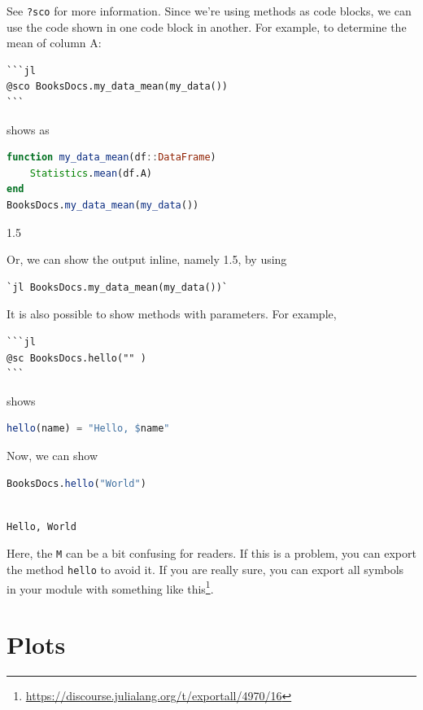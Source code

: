 \documentclass[
  notoc %
]{tufte-book}
\DeclareRobustCommand{\href}[2]{#2\footnote{\url{#1}}}
\newcommand{\passthrough}[1]{#1}
\begin{document}
See \passthrough{\lstinline!?sco!} for more information. Since we're
using methods as code blocks, we can use the code shown in one code
block in another. For example, to determine the mean of column A:

\begin{lstlisting}
```jl
@sco BooksDocs.my_data_mean(my_data())
```
\end{lstlisting}

shows as

\begin{lstlisting}[language=Julia]
function my_data_mean(df::DataFrame)
    Statistics.mean(df.A)
end
BooksDocs.my_data_mean(my_data())
\end{lstlisting}

1.5

Or, we can show the output inline, namely 1.5, by using

\begin{lstlisting}
`jl BooksDocs.my_data_mean(my_data())`
\end{lstlisting}

It is also possible to show methods with parameters. For example,

\begin{lstlisting}
```jl
@sc BooksDocs.hello("" )
```
\end{lstlisting}

shows

\begin{lstlisting}[language=Julia]
hello(name) = "Hello, $name"
\end{lstlisting}

Now, we can show

\begin{lstlisting}[language=Julia]
BooksDocs.hello("World")
\end{lstlisting}

\begin{lstlisting}[language=Output]

Hello, World

\end{lstlisting}

Here, the \passthrough{\lstinline!M!} can be a bit confusing for
readers. If this is a problem, you can export the method
\passthrough{\lstinline!hello!} to avoid it. If you are really sure, you
can export all symbols in your module with something like
\href{https://discourse.julialang.org/t/exportall/4970/16}{this}.

\hypertarget{sec:plots}{%
\section{Plots}\label{sec:plots}}
\end{document}

